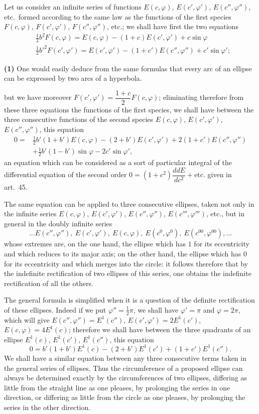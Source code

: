 \documentclass{article}
\begin{document}
Let us consider an infinite series of functions $E(c,\varphi)$, $E(c',\varphi')$, $E(c'',\varphi'')$, etc.\ formed according to the same law as the functions of the first species $F(c,\varphi)$, $F(c',\varphi')$, $F(c'',\varphi'')$, etc.; we shall have first the two equations
\[ \begin{aligned} &\tfrac{1}{2}b^{2}F(c,\varphi)=E(c,\varphi)-(1+c)E(c',\varphi')+c\sin\varphi\\ &\tfrac{1}{2}b'^{2}F(c',\varphi')=E(c',\varphi')-(1+c')E(c'',\varphi'')+c'\sin\varphi'; \end{aligned} \]

\textbf{(1)} One would easily deduce from the same formulas that every arc of an ellipse can be expressed by two arcs of a hyperbola.

but we have moreover $F(c',\varphi')=\dfrac{1+c}{2}F(c,\varphi)$; eliminating therefore from these three equations the functions of the first species, we shall have between the three consecutive functions of the second species $E(c,\varphi)$, $E(c',\varphi')$, $E(c'',\varphi'')$, this equation
\[ \begin{aligned} 0={}&\tfrac{1}{2}b'(1+b')E(c,\varphi)-(2+b')E(c',\varphi')+2(1+c')E(c'',\varphi'')\\ &+\tfrac{1}{2}b'(1-b')\sin\varphi-2c'\sin\varphi', \end{aligned} \]
an equation which can be considered as a sort of particular integral of the differential equation of the second order $0=(1+c^{2})\dfrac{ddE}{dc^{2}}+\text{etc.}$ given in art.~45.

The same equation can be applied to three consecutive ellipses, taken not only in the infinite series $E(c,\varphi)$, $E(c',\varphi')$, $E(c'',\varphi'')$, $E(c''',\varphi''')$, etc., but in general in the doubly infinite series
\[ \ldots E(c'',\varphi''),\ E(c',\varphi'),\ E(c,\varphi),\ E(c^{0},\varphi^{0}),\ E(c^{00},\varphi^{00}),\ldots \]
whose extremes are, on the one hand, the ellipse which has $1$ for its eccentricity and which reduces to its major axis; on the other hand, the ellipse which has $0$ for its eccentricity and which merges into the circle: it follows therefore that by the indefinite rectification of two ellipses of this series, one obtains the indefinite rectification of all the others.

The general formula is simplified when it is a question of the definite rectification of these ellipses. Indeed if we put $\varphi''=\frac{1}{2}\pi$, we shall have $\varphi'=\pi$ and $\varphi=2\pi$, which will give $E(c'',\varphi'')=E^{1}(c'')$, $E(c',\varphi')=2E^{1}(c')$, $E(c,\varphi)=4E^{1}(c)$; therefore we shall have between the three quadrants of an ellipse $E^{1}(c)$, $E^{1}(c')$, $E^{1}(c'')$, this equation
\[ 0=b'(1+b')E^{1}(c)-(2+b')E^{1}(c')+(1+c')E^{1}(c''). \]
We shall have a similar equation between any three consecutive terms taken in the general series of ellipses. Thus the circumference of a proposed ellipse can always be determined exactly by the circumferences of two ellipses, differing as little from the straight line as one pleases, by prolonging the series in one direction, or differing as little from the circle as one pleases, by prolonging the series in the other direction.
\end{document}
